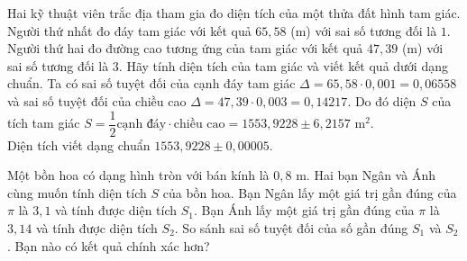 \begin{bt}%
	Hai kỹ thuật viên trắc địa tham gia đo diện tích của một thửa đất hình tam giác. Người thứ nhất đo đáy tam giác với kết quả $ 65{,}58 $ (m) với sai số tương đối là $ 1 $\textperthousand. Người thứ hai đo đường cao tương ứng của tam giác với kết quả $ 47{,}39 $ (m) với sai số tương đối là $ 3 $\textperthousand. Hãy tính diện tích của tam giác và viết kết quả dưới dạng chuẩn.
	\loigiai
	{
		Ta có sai số tuyệt đối của cạnh đáy tam giác $ \Delta =65{,}58\cdot 0{,}001=0{,}06558 $ và sai số tuyệt đối của chiều cao $ \Delta =47{,}39\cdot 0{,}003=0{,}14217 $. Do đó diện $ S $ của tích tam giác $ S=\dfrac{1}{2}\text{cạnh đáy}\cdot \text{chiều cao}=1553{,}9228\pm 6{,}2157 $ m$ ^2 $.\\
		Diện tích viết dạng chuẩn $ 1553{,}9228\pm 0{,}00005 $.
	}
\end{bt}

\begin{bt}%
	Một bồn hoa có dạng hình tròn với bán kính là $0{,}8$ m. Hai bạn Ngân và Ánh cùng muốn tính diện tích $S$ của bồn hoa. Bạn Ngân lấy một giá trị gần đúng của $\pi$ là $3{,}1$ và tính được diện tích $S_1$. Bạn Ánh lấy một giá trị gần đúng của $\pi$ là $3{,}14$ và tính được diện tích $S_2$. So sánh sai số tuyệt đối của số gần đúng $S_1$ và $S_2$. Bạn nào có kết quả chính xác hơn?
\end{bt}

